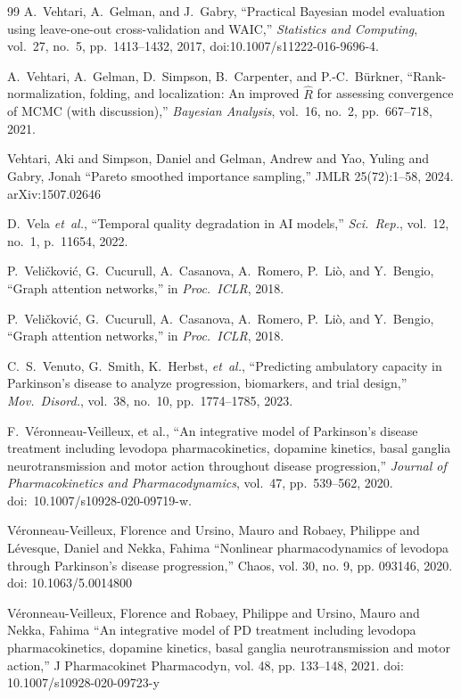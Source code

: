 \begin{thebibliography}{99}
A.~Vehtari, A.~Gelman, and J.~Gabry, ``Practical Bayesian model evaluation using leave-one-out cross-validation and WAIC,'' \textit{Statistics and Computing}, vol.~27, no.~5, pp.~1413--1432, 2017, doi:10.1007/s11222-016-9696-4.

A.~Vehtari, A.~Gelman, D.~Simpson, B.~Carpenter, and P.-C.~B{\"u}rkner, ``Rank-normalization, folding, and localization: An improved $\widehat{R}$ for assessing convergence of MCMC (with discussion),'' \textit{Bayesian Analysis}, vol.~16, no.~2, pp.~667--718, 2021.

 Vehtari, Aki and Simpson, Daniel and Gelman, Andrew and Yao, Yuling and Gabry, Jonah ``Pareto smoothed importance sampling,'' JMLR 25(72):1--58, 2024. arXiv:1507.02646

D.~Vela \textit{et~al.}, ``Temporal quality degradation in AI models,'' \textit{Sci.\ Rep.}, vol.~12, no.~1, p.~11654, 2022.

P.~Veli\v{c}kovi\'{c}, G.~Cucurull, A.~Casanova, A.~Romero, P.~Li\`{o}, and Y.~Bengio, ``Graph attention networks,'' in \textit{Proc.\ ICLR}, 2018.

P.~Veli\v{c}kovi\'{c}, G.~Cucurull, A.~Casanova, A.~Romero, P.~Li\`{o}, and Y.~Bengio, ``Graph attention networks,'' in \textit{Proc.\ ICLR}, 2018.

C.~S.~Venuto, G.~Smith, K.~Herbst, \textit{et~al.}, ``Predicting ambulatory capacity in Parkinson's disease to analyze progression, biomarkers, and trial design,'' \textit{Mov.\ Disord.}, vol.~38, no.~10, pp.~1774--1785, 2023.

F.~V\'{e}ronneau-Veilleux, et al., ``An integrative model of Parkinson's disease treatment including levodopa pharmacokinetics, dopamine kinetics, basal ganglia neurotransmission and motor action throughout disease progression,'' \textit{Journal of Pharmacokinetics and Pharmacodynamics}, vol.~47, pp.~539--562, 2020. doi:~10.1007/s10928-020-09719-w.

 V\'eronneau-Veilleux, Florence and Ursino, Mauro and Robaey, Philippe and L\'evesque, Daniel and Nekka, Fahima ``Nonlinear pharmacodynamics of levodopa through Parkinson's disease progression,'' Chaos, vol. 30, no. 9, pp. 093146, 2020. doi: 10.1063/5.0014800

 V\'eronneau-Veilleux, Florence and Robaey, Philippe and Ursino, Mauro and Nekka, Fahima ``An integrative model of PD treatment including levodopa pharmacokinetics, dopamine kinetics, basal ganglia neurotransmission and motor action,'' J Pharmacokinet Pharmacodyn, vol. 48, pp. 133--148, 2021. doi: 10.1007/s10928-020-09723-y


\end{thebibliography}
